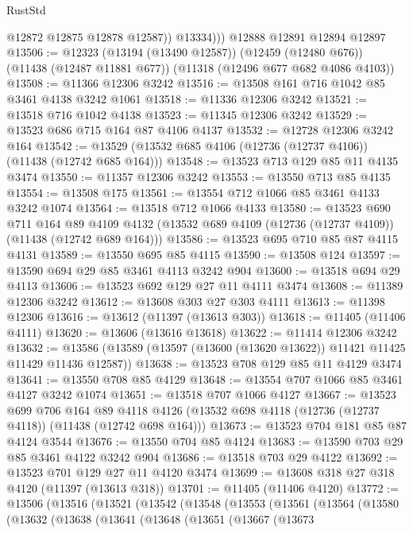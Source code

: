 \begin{lexlean}{RustStd}
\begin{coremodule}
              @12872
              @12875
              @12878
              @12587))
          @13334)))
    @12888
    @12891
    @12894
    @12897
@13506 := @12323
    (@13194 (@13490 @12587))
    (@12459 (@12480 @676))
    (@11438 (@12487 @11881 @677))
    (@11318 (@12496 @677 @682 @4086 @4103))
@13508 := @11366 @12306 @3242
@13516 := @13508 @161 @716 @1042 @85 @3461 @4138 @3242 @1061
@13518 := @11336 @12306 @3242
@13521 := @13518 @716 @1042 @4138
@13523 := @11345 @12306 @3242
@13529 := @13523 @686 @715 @164 @87 @4106 @4137
@13532 := @12728 @12306 @3242 @164
@13542 := @13529 (@13532 @685 @4106 (@12736 (@12737 @4106)) (@11438 (@12742 @685 @164)))
@13548 := @13523 @713 @129 @85 @11 @4135 @3474
@13550 := @11357 @12306 @3242
@13553 := @13550 @713 @85 @4135
@13554 := @13508 @175
@13561 := @13554 @712 @1066 @85 @3461 @4133 @3242 @1074
@13564 := @13518 @712 @1066 @4133
@13580 := @13523
    @690
    @711
    @164
    @89
    @4109
    @4132
    (@13532 @689 @4109 (@12736 (@12737 @4109)) (@11438 (@12742 @689 @164)))
@13586 := @13523 @695 @710 @85 @87 @4115 @4131
@13589 := @13550 @695 @85 @4115
@13590 := @13508 @124
@13597 := @13590 @694 @29 @85 @3461 @4113 @3242 @904
@13600 := @13518 @694 @29 @4113
@13606 := @13523 @692 @129 @27 @11 @4111 @3474
@13608 := @11389 @12306 @3242
@13612 := @13608 @303 @27 @303 @4111
@13613 := @11398 @12306
@13616 := @13612 (@11397 (@13613 @303))
@13618 := @11405 (@11406 @4111)
@13620 := @13606 (@13616 @13618)
@13622 := @11414 @12306 @3242
@13632 := @13586 (@13589 (@13597 (@13600 (@13620 @13622)) @11421 @11425 @11429 @11436 @12587))
@13638 := @13523 @708 @129 @85 @11 @4129 @3474
@13641 := @13550 @708 @85 @4129
@13648 := @13554 @707 @1066 @85 @3461 @4127 @3242 @1074
@13651 := @13518 @707 @1066 @4127
@13667 := @13523
    @699
    @706
    @164
    @89
    @4118
    @4126
    (@13532 @698 @4118 (@12736 (@12737 @4118)) (@11438 (@12742 @698 @164)))
@13673 := @13523 @704 @181 @85 @87 @4124 @3544
@13676 := @13550 @704 @85 @4124
@13683 := @13590 @703 @29 @85 @3461 @4122 @3242 @904
@13686 := @13518 @703 @29 @4122
@13692 := @13523 @701 @129 @27 @11 @4120 @3474
@13699 := @13608 @318 @27 @318 @4120 (@11397 (@13613 @318))
@13701 := @11405 (@11406 @4120)
@13772 := @13506
    (@13516
      (@13521
        (@13542
          (@13548
            (@13553
              (@13561
                (@13564
                  (@13580
                    (@13632
                      (@13638
                        (@13641
                          (@13648
                            (@13651
                              (@13667
                                (@13673

\end{coremodule}
\end{lexlean}
